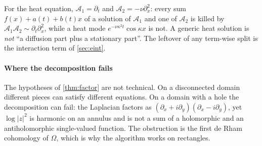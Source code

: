 \documentclass[11pt]{article}
\theoremstyle{plain}
\theoremstyle{definition}
\theoremstyle{remark}
\newcommand{\Var}{V}                        %
\newcommand{\deltaP}{\delta(P)}             %
\newcommand{\abs}[1]{\lvert#1\rvert}
\newcommand{\roleinalg}[1]{\par\noindent\emph{Role in the algorithm.} #1\par}
\renewcommand{\roleinalg}[1]{}
\begin{document}
For the heat equation, $\mathcal A_1=\partial_t$ and $\mathcal A_2=-\nu\partial_x^2$: every sum $f(x)+a(t)+b(t)x$ of a
solution of $\mathcal A_1$ and one of $\mathcal A_2$ is killed by $\mathcal A_1\mathcal A_2\sim\partial_t\partial_x^2$, while a heat mode
$e^{-\nu\kappa^2t}\cos\kappa x$ is not. A generic heat solution is \emph{not} ``a diffusion part plus a
stationary part''. The leftover of any term-wise split is the interaction term of
\cref{sec:eint}.

\paragraph{Where the decomposition fails}
The hypotheses of \cref{thm:factor} are not technical. On a disconnected domain different pieces
can satisfy different equations. On a domain with a hole the decomposition can fail: the Laplacian
factors as $(\partial_x+i\partial_y)(\partial_x-i\partial_y)$, yet $\log\abs{z}^2$ is harmonic on an annulus
and is not a sum of a holomorphic and an antiholomorphic single-valued function. The obstruction is
the first de Rham cohomology of $\Omega$, which is why the algorithm works on rectangles.

\roleinalg{\Cref{thm:factor} is the grouping principle of the paper. The objects that a learning
algorithm should group are \emph{modes of the same factor}; equivalently, points of the data's
Fourier--Laplace spectrum lying on the same irreducible component of $\Var(P)$. The overlap $\deltaP$
is the irreducible amount of ambiguity, and the algorithm resolves it by a fixed convention
(the companion algorithm paper).}



\end{document}
